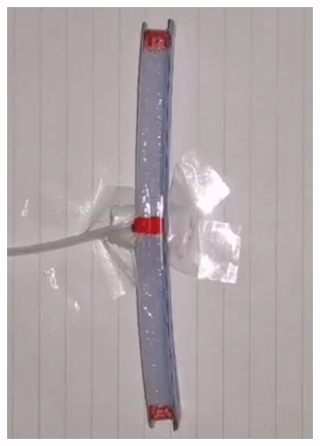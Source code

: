 \documentclass[conference]{IEEEtran}
\begin{document}
\begin{figure}[htbp]
  \centering
  \begin{subfigure}[b]{0.25\linewidth}
    \centering
    \includegraphics[width=\linewidth]{pics/变形1.png}
    \caption{}
    \label{fig:image1}
  \end{subfigure}
  \begin{subfigure}[b]{0.25\linewidth}
    \centering

\end{subfigure}
\end{figure}
\end{document}
